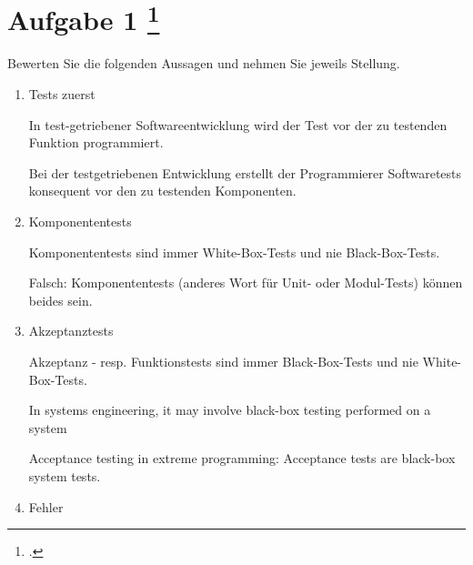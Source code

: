 \documentclass{lehramt-informatik-aufgabe}
\begin{document}
\section{Aufgabe 1
\footcite{66116:2019:03}}

Bewerten Sie die folgenden Aussagen und nehmen Sie jeweils Stellung.

\begin{enumerate}

\item Tests zuerst

In test-getriebener Softwareentwicklung wird der Test vor der zu
testenden Funktion programmiert.

\begin{liAntwort}
Bei der testgetriebenen Entwicklung erstellt der Programmierer
Softwaretests konsequent vor den zu testenden Komponenten.
\end{liAntwort}


\item Komponententests

Komponententests sind immer White-Box-Tests und nie Black-Box-Tests.

\begin{liAntwort}
Falsch: Komponententests (anderes Wort für Unit- oder Modul-Tests) können beides sein.
\end{liAntwort}


\item Akzeptanztests

Akzeptanz - resp. Funktionstests sind immer Black-Box-Tests und nie
White-Box-Tests.

\begin{liAntwort}
In systems engineering, it may involve black-box testing performed on a system

Acceptance testing in extreme programming:  Acceptance tests are black-box system tests.

\end{liAntwort}


\item Fehler


\end{enumerate}
\end{document}
